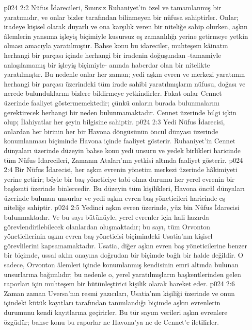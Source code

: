 \vs p024 2:2 Nüfus İdarecileri, Sınırsız Ruhaniyet’in özel ve tamamlanmış bir yaratımıdır, ve onlar bizler tarafından bilinmeyen bir nüfusa sahiptirler. Onlar;  iradeye kişisel olarak duyarlı ve ona karşılık veren bir niteliğe sahip olurken, aşkın âlemlerin yansıma işleyiş biçimiyle kusursuz eş zamanlılığı yerine getirmeye yetkin olması amacıyla yaratılmıştır. Bahse konu bu idareciler, muhteşem kâinatın herhangi bir parçası içinde herhangi bir iradenin doğuşundan \hyp{}tamamiyle anlaşılamamış bir işleyiş biçimiyle\hyp{} anında haberdar olan bir nitelikte yaratılmıştır. Bu nedenle onlar her zaman; yedi aşkın evren ve merkezi yaratımın herhangi bir parçası üzerindeki tüm irade sahibi yaratılmışların nüfusu, doğası ve nerede bulunduklarını bizlere bildirmeye yetkindirler. Fakat onlar Cennet üzerinde faaliyet göstermemektedir; çünkü onların burada bulunmalarını gerektirecek herhangi bir neden bulunmamaktadır. Cennet üzerinde bilgi içkin olup; İlahiyatlar her şeyin bilgisine sahiptir.
\vs p024 2:3 Yedi Nüfus İdarecisi, onlardan her birinin her bir Havona döngüsünün öncül dünyası üzerinde konumlanması biçiminde Havona içinde faaliyet gösterir. Ruhaniyet’in Cennet dünyaları üzerinde düzeyin bahse konu yedi unsuru ve yedek birlikleri haricinde tüm Nüfus İdarecileri, Zamanın Ataları’nın yetkisi altında faaliyet gösterir.
\vs p024 2:4 Bir Nüfus İdarecisi, her aşkın evrenin yönetim merkezi üzerinde hâkimiyeti yerine getirir; böyle bir baş yöneticiye tabi olma durumu her yerel evrenin bir başkenti üzerinde binlercedir. Bu düzeyin tüm kişilikleri, Havona öncül dünyaları üzerinde bulunan unsurlar ve yedi aşkın evren baş yöneticileri haricinde eş niteliğe sahiptir.
\vs p024 2:5 Yedinci aşkın evren üzerinde, yüz bin Nüfus İdarecisi bulunmaktadır. Ve bu sayı bütünüyle, yerel evrenler için hali hazırda görevlendirilebilecek olanlardan oluşmaktadır; bu sayı, tüm Orvonton yöneticilerinin aşkın evren baş yöneticisi biçimindeki Usatia’nın kişisel görevlilerini kapsamamaktadır. Usatia, diğer aşkın evren baş yöneticilerine benzer bir biçimde, ussal aklın onayına doğrudan bir biçimde bağlı bir halde değildir. O sadece, Orvonton âlemleri içinde konumlanmış kendisinin emri altında bulunan unsurlarına bağımlıdır; bu nedenle o, yerel yaratılmışların başkentlerinden gelen raporları için muhteşem bir bütünleştirici kişilik olarak hareket eder.
\vs p024 2:6 Zaman zaman Uversa’nın resmi yazıcıları, Usatia’nın kişiliği üzerinde ve onun içindeki kütük kayıtları tarafından tanımlandığı biçimde aşkın evrenlerin durumunu kendi kayıtlarına geçirirler. Bu tür sayım verileri aşkın evrenlere özgüdür; bahse konu bu raporlar ne Havona’ya ne de Cennet’e iletilirler.
